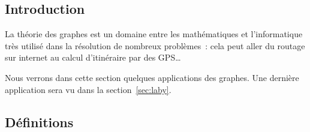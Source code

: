 \subsection{Introduction}
  La théorie des graphes est un domaine entre les mathématiques et
  l'informatique très utilisé dans la résolution de nombreux problèmes~: cela
  peut aller du routage sur internet au calcul d'itinéraire par des GPS\dots
  
  Nous verrons dans cette section quelques applications des graphes. Une
  dernière application sera vu dans la section~\ref{sec:laby}.

\subsection{Définitions}
